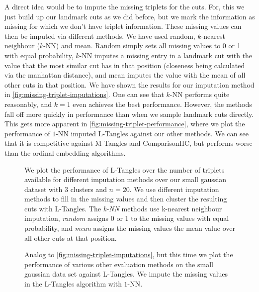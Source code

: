 A direct idea would be to impute the missing triplets for the cuts.  For, this we just build up our landmark cuts as we did before,
but we mark the information as missing for which we don't have triplet information. These missing values can then be imputed via different methods.
We have used random, $k$-nearest neighbour ($k$-NN) and mean. Random simply sets all missing values to 0 or 1 with equal probability, $k$-NN imputes
a missing entry in a landmark cut with the value that the most similar cut has in that position (closeness being calculated via the manhattan distance), and mean 
imputes the value with the mean of all other cuts in that position. 
We have shown the results for our imputation method in \autoref{fig:missing-triplet-imputations}.  One can see that $k$-NN performs quite reasonably, and $k=1$ even achieves the best performance.
However, the methods fall off more quickly in performance than when we sample landmark cuts directly. This gets more apparent in \autoref{fig:missing-triplet-performance}, where we plot
the performance of $1$-NN imputed L-Tangles against our other methods. We can see that it is competitive against M-Tangles and ComparisonHC, but performs worse than the ordinal embedding algorithms.

\begin{figure}[ht]
    \centering
    \resizebox{0.7\textwidth}{!}{}
    \caption{
        We plot the performance of L-Tangles over the number of triplets available for different imputation methods over our small gaussian dataset with $3$ clusters
        and $n=20$. We use different imputation methods to fill in the missing values and then cluster the resulting cuts with L-Tangles.
        The \textit{k-NN} methods use k-nearest neighbour imputation, \textit{random} assigns 0 or 1 to the missing values with equal probability, and \textit{mean} assigns the missing
        values the mean value over all other cuts at that position.
    }
    \label{fig:missing-triplet-imputations}
\end{figure}

\begin{figure}[ht]
    \centering
    \resizebox{0.7\textwidth}{!}{}
    \caption{
        Analog to \autoref{fig:missing-triplet-imputations}, but this time we plot the performance of various other evaluation methods on the small gaussian data set against L-Tangles.
        We impute the missing values in the L-Tangles algorithm with $1$-NN.
    }
    \label{fig:missing-triplet-performance}
\end{figure}


